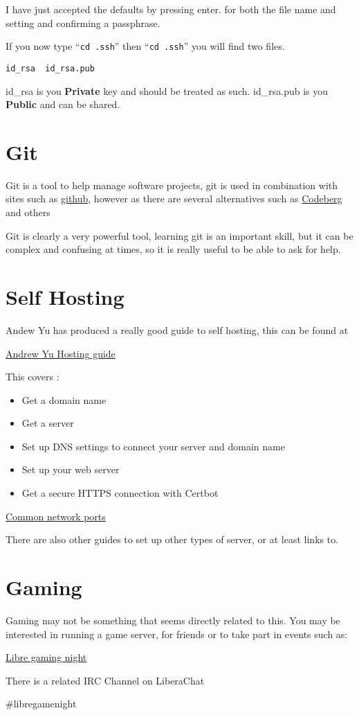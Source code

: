 \documentclass{extbook}
\begin{document}
I have just accepted the defaults by pressing enter.  for both the file name and setting and confirming a passphrase. 

If you now type ``\verb|cd .ssh|'' then ``\verb|cd .ssh|'' you will find two files. 

\begin{verbatim}
id_rsa  id_rsa.pub
\end{verbatim}

id_rsa is you \textbf{Private} key and should be treated as such.  id_rsa.pub is you \textbf{Public} and can be shared. 

\section{Git}

Git is a tool to help manage software projects,  git is used in combination with sites such as \href{https://www.git.com}{github}, however as there are several alternatives such as 
\href{https://codeberg.org/}{Codeberg} and others

Git is clearly a very powerful tool,  learning git is an important skill, but it can be complex and confusing at times, so it is really useful to be able to ask for help. 

 

\section{Self Hosting}

Andew Yu has produced a really good guide to self hosting,  this can be found at

\href{https://host.andrewyu.org/}{Andrew Yu Hosting guide}

This covers :

\begin{itemize}
\item Get a domain name
\item Get a server
\item Set up DNS settings to connect your server and domain name
\item Set up your web server
\item Get a secure HTTPS connection with Certbot
\end{itemize}

\href{https://networkverge.com/common-ports/}{Common network ports}

There are also other guides to set up other types of server, or at least links to.    

\section{Gaming}

Gaming may not be something that seems directly related to this.  You may be interested in running a game server, for friends or to take part in events such as: 

\href{https://libregaming.org/}{Libre gaming night}

There is a related IRC Channel on LiberaChat 

\#libregamenight
\end{document}
